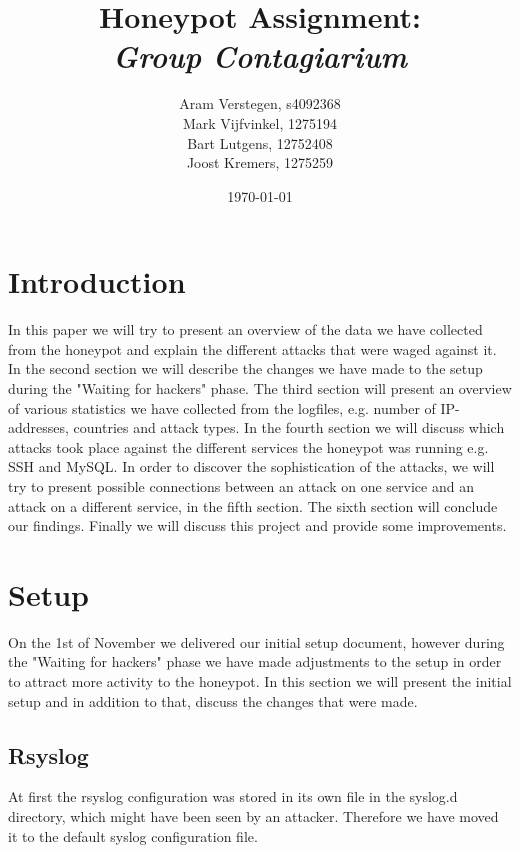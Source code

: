 \documentclass[11pt]{article}
\title{\textbf{Honeypot Assignment: \\ \emph{Group Contagiarium}}}
\author{Aram Verstegen, s4092368 \\
	 Mark Vijfvinkel, 1275194 \\
	 Bart Lutgens, 12752408 \\
	Joost Kremers, 1275259}
\date{\today}
\begin{document}
\maketitle


\section{Introduction}
In this paper we will try to present an overview of the data we have collected from the honeypot and explain the different attacks that were waged against it. 
In the second section we will describe the changes we have made to the setup during the "Waiting for hackers" phase. 
The third section will present an overview of various statistics we have collected from the logfiles, e.g. number of IP-addresses, countries and attack types. 
In the fourth section we will discuss which attacks took place against the different services the honeypot was running e.g. SSH and MySQL.
In order to discover the sophistication of the attacks, we will try to present possible connections between an attack on one service and an attack on a different service, in the fifth section.
The sixth section will conclude our findings. 
Finally we will discuss this project and provide some improvements. 


\section{Setup}
\label{Setup}

On the 1st of November we delivered our initial setup document, however during the "Waiting for hackers" phase we have made adjustments to the setup in order to attract more activity to the honeypot. In this section we will present the initial setup and in addition to that, discuss the changes that were made.


\subsection{Rsyslog}
At first the rsyslog configuration was stored in its own file in the syslog.d directory, which might have been seen by an attacker.
Therefore we have moved it to the default syslog configuration file. 
\end{document}
